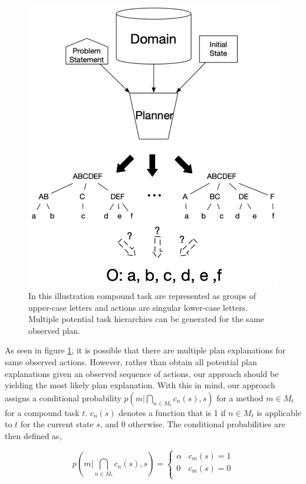 \begin{figure}[h]
    \centering
    \includegraphics[width=1\textwidth]{images/pr_as_planning}
    \caption{In this illustration compound task are represented as groups of upper-case letters and actions are singular lower-case letters. Multiple potential task hierarchies can be generated for the same observed plan.} 
    \label{fig:2}
\end{figure}

As seen in figure \ref{fig:2}, it is possible that there are multiple plan explanations for same observed actions. However, rather than obtain all potential plan explanations given an observed sequence of actions, our approach should be yielding the most likely plan explanation. With this in mind, our approach assigns a conditional probability $p(m | \bigcap_{n \in M_t} c_n(s), s)$ for a method $m \in M_t$ for a compound task $t$. $c_n(s)$ denotes a function that is 1 if $n \in M_t$ is applicable to $t$ for the current state $s$, and 0 otherwise. The conditional probabilities are then defined as,

\begin{equation}
p(m | \bigcap_{n \in M_t} c_n(s), s) = \begin{cases} \alpha  & c_m(s) = 1 \\ 0 & c_m(s) = 0 \\ \end{cases}
\end{equation}

